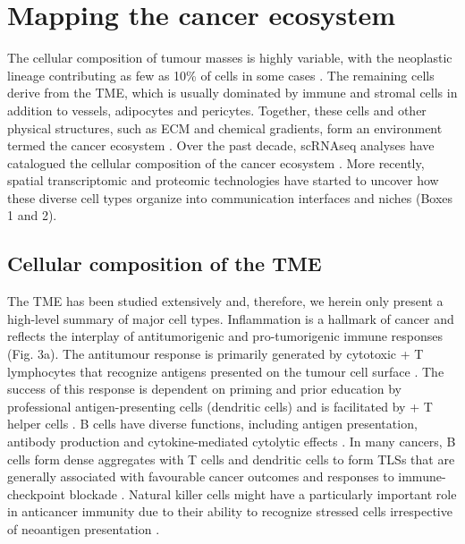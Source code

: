 \section{Mapping the cancer ecosystem}
\label{sec:mapping-the-cancer-ecosystem}
The cellular composition of tumour masses is highly variable, with the neoplastic lineage contributing as few as 10\% of cells in some cases \parencite{Aran2015-dw}. The remaining cells derive from the TME, which is usually dominated by immune and stromal cells in addition to vessels, adipocytes and pericytes. Together, these cells and other physical structures, such as \ac{ECM} and chemical gradients, form an environment termed the cancer ecosystem \parencite{Somarelli2021-va}. Over the past decade, \ac{scRNAseq} analyses have catalogued the cellular composition of the cancer ecosystem \parencite{Darmanis2017-yb,Venteicher2017-mo,Pombo_Antunes2021-md,Puram2017-mn,Tirosh2016-rl,Izar2020-tf,Lambrechts2018-hx,Chung2017-ic}. More recently, spatial transcriptomic and proteomic technologies have started to uncover how these diverse cell types organize into communication interfaces and niches \parencite{Schapiro2017-gy,Arnol2019-fv} (Boxes 1 and 2).

\subsection*{Cellular composition of the \ac{TME}}
The \ac{TME} has been studied extensively and, therefore, we herein only present a high-level summary of major cell types. Inflammation is a hallmark of cancer \parencite{Hanahan2011-cd} and reflects the interplay of antitumorigenic and pro-tumorigenic immune responses (Fig. 3a). The antitumour response is primarily generated by cytotoxic + T lymphocytes that recognize antigens presented on the tumour cell surface \parencite{Raskov2021-gb,Philip2022-ly}. The success of this response is dependent on priming and prior education by professional antigen-presenting cells (dendritic cells) and is facilitated by + T helper cells \parencite{Borst2018-tp,Waldman2020-kf}. B cells have diverse functions, including antigen presentation, antibody production and cytokine-mediated cytolytic effects \parencite{Sharonov2020-vx}. In many cancers, B cells form dense aggregates with T cells and dendritic cells to form \acp{TLS} \parencite{Schumacher2022-mr} that are generally associated with favourable cancer outcomes and responses to immune-checkpoint blockade \parencite{Sautes-Fridman2019-nl}. Natural killer cells might have a particularly important role in anticancer immunity due to their ability to recognize stressed cells irrespective of neoantigen presentation \parencite{Wolf2023-hu}.

